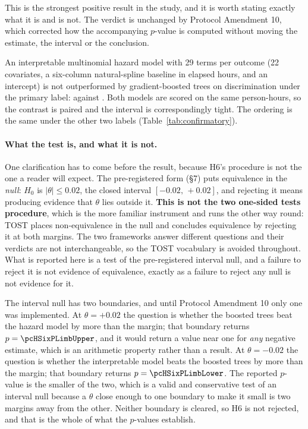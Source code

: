 This is the strongest positive result in the study, and it is worth stating
exactly what it is and is not. The verdict is unchanged by Protocol
Amendment 10, which corrected how the accompanying $p$-value is computed
without moving the estimate, the interval or the conclusion.

An interpretable multinomial hazard model with 29 terms per outcome
(22 covariates, a six-column natural-spline baseline in elapsed hours, and an
intercept) is not outperformed by gradient-boosted
trees on discrimination under the primary label: \pcAurocPrimaryB{} against
\pcAurocGbtB. Both models are scored on the same person-hours, so the contrast
is paired and the interval is correspondingly tight. The ordering is the same
under the other two labels (Table~\ref{tab:confirmatory}).

\paragraph{What the test is, and what it is not.} One clarification has to come
before the result, because H6's procedure is not the one a reader will expect.
The pre-registered form (\S7) puts equivalence in the \emph{null}: $H_0$ is
$|\theta| \leq 0.02$, the closed interval $[-0.02,\, +0.02]$, and rejecting it
means producing evidence that $\theta$ lies outside it. \textbf{This is not
the two one-sided tests procedure}, which is the more familiar instrument and
runs the other way round: TOST places non-equivalence in the null and concludes
equivalence by rejecting it at both margins. The two frameworks answer
different questions and their verdicts are not interchangeable, so the TOST
vocabulary is avoided throughout. What is reported here is a test of the
pre-registered interval null, and a failure to reject it is not evidence of
equivalence, exactly as a failure to reject any null is not evidence for it.

The interval null has two boundaries, and until Protocol Amendment 10 only one
was implemented. At $\theta = +0.02$ the question is whether the boosted trees
beat the hazard model by more than the margin; that boundary returns
$p = \pcHSixPLimbUpper$, and it would return a value near one for \emph{any}
negative estimate, which is an arithmetic property rather than a result. At
$\theta = -0.02$ the question is whether the interpretable model beats the
boosted trees by more than the margin; that boundary returns
$p = \pcHSixPLimbLower$. The reported $p$-value is the smaller of the two,
which is a valid and conservative test of an interval null because a $\theta$
close enough to one boundary to make it small is two margins away from the
other. Neither boundary is cleared, so H6 is not rejected, and that is the
whole of what the $p$-values establish.

